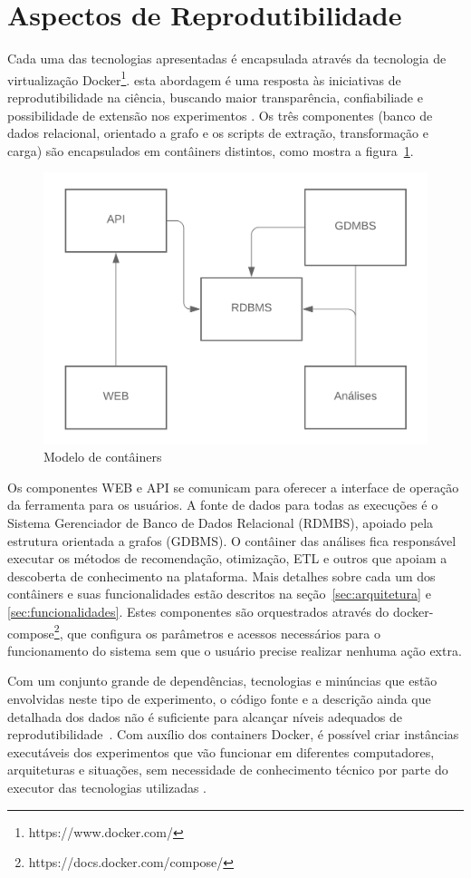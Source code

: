 \documentclass[12pt,openany,oneside,a4paper,english,brazil]{abntbibufjf}
\begin{document}
    \section{Aspectos de Reprodutibilidade}

    Cada uma das tecnologias apresentadas é encapsulada através da tecnologia de virtualização Docker\footnote{https://www.docker.com/}. esta abordagem é uma resposta às iniciativas de reprodutibilidade na ciência, buscando maior transparência, confiabiliade e possibilidade de extensão nos experimentos \cite{freire2012}. Os três componentes (banco de dados relacional, orientado a grafo e os scripts de extração, transformação e carga) são encapsulados em contâiners distintos, como mostra a figura~\ref{fig:docker-model}.

    \begin{figure}[!htbp]
     \includegraphics[width=.7\textwidth]{docker-model}
     \caption{Modelo de contâiners}\label{fig:docker-model}
    \end{figure}

    Os componentes WEB e API se comunicam para oferecer a interface de operação da ferramenta para os usuários. A fonte de dados para todas as execuções é o Sistema Gerenciador de Banco de Dados Relacional (RDMBS), apoiado pela estrutura orientada a grafos (GDBMS). O contâiner das análises fica responsável executar os métodos de recomendação, otimização, ETL e outros que apoiam a descoberta de conhecimento na plataforma. Mais detalhes sobre cada um dos contâiners e suas funcionalidades estão descritos na seção~\ref{sec:arquitetura} e \ref{sec:funcionalidades}. Estes componentes são orquestrados através do docker-compose\footnote{https://docs.docker.com/compose/}, que configura os parâmetros e acessos necessários para o funcionamento do sistema sem que o usuário precise realizar nenhuma ação extra.

    Com um conjunto grande de dependências, tecnologias e minúncias que estão envolvidas neste tipo de experimento, o código fonte e a descrição ainda que detalhada dos dados não é suficiente para alcançar níveis adequados de reprodutibilidade~\cite{ince2012}. Com auxílio dos containers Docker, é possível criar instâncias executáveis dos experimentos que vão funcionar em diferentes computadores, arquiteturas e situações, sem necessidade de conhecimento técnico por parte do executor das tecnologias utilizadas \cite{boettiger2015}.
\end{document}

